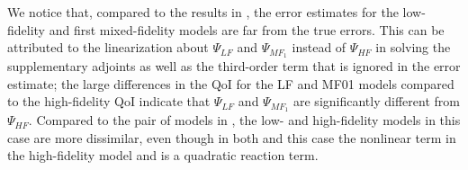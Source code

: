 We notice that, compared to the results in , the error estimates for the low-fidelity and first mixed-fidelity models are far from the true errors. This can be attributed to the linearization about $\Psi_{LF}$ and $\Psi_{MF_{1}}$ instead of $\Psi_{HF}$ in solving the supplementary adjoints as well as the third-order term that is ignored in the error estimate; the large differences in the QoI for the LF and MF01 models compared to the high-fidelity QoI indicate that $\Psi_{LF}$ and $\Psi_{MF_{1}}$ are significantly different from $\Psi_{HF}$. Compared to the pair of models in , the low- and high-fidelity models in this case are more dissimilar, even though in both  and this case the nonlinear term in the high-fidelity model  and  is a quadratic reaction term. %

